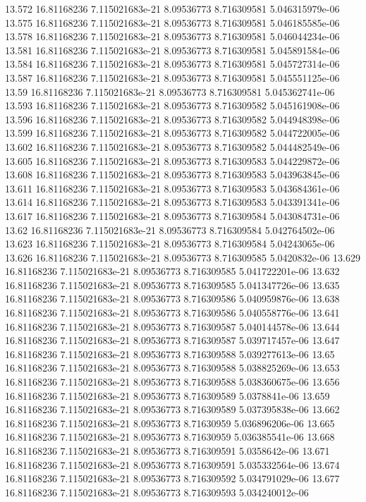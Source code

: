 {13.572 16.81168236 7.115021683e-21 8.09536773 8.716309581 5.046315979e-06
13.575 16.81168236 7.115021683e-21 8.09536773 8.716309581 5.046185585e-06
13.578 16.81168236 7.115021683e-21 8.09536773 8.716309581 5.046044234e-06
13.581 16.81168236 7.115021683e-21 8.09536773 8.716309581 5.045891584e-06
13.584 16.81168236 7.115021683e-21 8.09536773 8.716309581 5.045727314e-06
13.587 16.81168236 7.115021683e-21 8.09536773 8.716309581 5.045551125e-06
13.59 16.81168236 7.115021683e-21 8.09536773 8.716309581 5.045362741e-06
13.593 16.81168236 7.115021683e-21 8.09536773 8.716309582 5.045161908e-06
13.596 16.81168236 7.115021683e-21 8.09536773 8.716309582 5.044948398e-06
13.599 16.81168236 7.115021683e-21 8.09536773 8.716309582 5.044722005e-06
13.602 16.81168236 7.115021683e-21 8.09536773 8.716309582 5.044482549e-06
13.605 16.81168236 7.115021683e-21 8.09536773 8.716309583 5.044229872e-06
13.608 16.81168236 7.115021683e-21 8.09536773 8.716309583 5.043963845e-06
13.611 16.81168236 7.115021683e-21 8.09536773 8.716309583 5.043684361e-06
13.614 16.81168236 7.115021683e-21 8.09536773 8.716309583 5.043391341e-06
13.617 16.81168236 7.115021683e-21 8.09536773 8.716309584 5.043084731e-06
13.62 16.81168236 7.115021683e-21 8.09536773 8.716309584 5.042764502e-06
13.623 16.81168236 7.115021683e-21 8.09536773 8.716309584 5.04243065e-06
13.626 16.81168236 7.115021683e-21 8.09536773 8.716309585 5.0420832e-06
13.629 16.81168236 7.115021683e-21 8.09536773 8.716309585 5.041722201e-06
13.632 16.81168236 7.115021683e-21 8.09536773 8.716309585 5.041347726e-06
13.635 16.81168236 7.115021683e-21 8.09536773 8.716309586 5.040959876e-06
13.638 16.81168236 7.115021683e-21 8.09536773 8.716309586 5.040558776e-06
13.641 16.81168236 7.115021683e-21 8.09536773 8.716309587 5.040144578e-06
13.644 16.81168236 7.115021683e-21 8.09536773 8.716309587 5.039717457e-06
13.647 16.81168236 7.115021683e-21 8.09536773 8.716309588 5.039277613e-06
13.65 16.81168236 7.115021683e-21 8.09536773 8.716309588 5.038825269e-06
13.653 16.81168236 7.115021683e-21 8.09536773 8.716309588 5.038360675e-06
13.656 16.81168236 7.115021683e-21 8.09536773 8.716309589 5.0378841e-06
13.659 16.81168236 7.115021683e-21 8.09536773 8.716309589 5.037395838e-06
13.662 16.81168236 7.115021683e-21 8.09536773 8.71630959 5.036896206e-06
13.665 16.81168236 7.115021683e-21 8.09536773 8.71630959 5.036385541e-06
13.668 16.81168236 7.115021683e-21 8.09536773 8.716309591 5.0358642e-06
13.671 16.81168236 7.115021683e-21 8.09536773 8.716309591 5.035332564e-06
13.674 16.81168236 7.115021683e-21 8.09536773 8.716309592 5.034791029e-06
13.677 16.81168236 7.115021683e-21 8.09536773 8.716309593 5.034240012e-06
}
